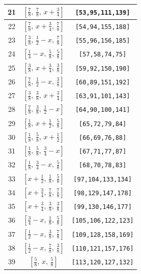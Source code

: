 \documentclass[fleqn,8pt]{jsarticle}
\begin{document}
\begin{longtable}{ccc}
21 & $\left[ \frac{7}{8},\, \frac{7}{8},\, x + \frac{3}{4} \right]$ & {\tt [53,95,111,139]} \\ \hline
22 & $\left[ \frac{7}{8},\, x + \frac{3}{4},\, \frac{7}{8} \right]$ & {\tt [54,94,155,188]} \\ \hline
23 & $\left[ \frac{3}{8},\, \frac{1}{2} - x,\, \frac{7}{8} \right]$ & {\tt [55,96,156,185]} \\ \hline
24 & $\left[ \frac{1}{4} - x,\, \frac{5}{8},\, \frac{5}{8} \right]$ & {\tt [57,58,74,75]} \\ \hline
25 & $\left[ \frac{3}{8},\, x + \frac{3}{4},\, \frac{3}{8} \right]$ & {\tt [59,92,150,190]} \\ \hline
26 & $\left[ \frac{7}{8},\, \frac{1}{2} - x,\, \frac{3}{8} \right]$ & {\tt [60,89,151,192]} \\ \hline
27 & $\left[ \frac{3}{8},\, \frac{3}{8},\, x + \frac{3}{4} \right]$ & {\tt [63,91,101,143]} \\ \hline
28 & $\left[ \frac{7}{8},\, \frac{3}{8},\, \frac{1}{2} - x \right]$ & {\tt [64,90,100,141]} \\ \hline
29 & $\left[ \frac{1}{8},\, x + \frac{1}{2},\, \frac{5}{8} \right]$ & {\tt [65,72,79,84]} \\ \hline
30 & $\left[ \frac{1}{8},\, \frac{5}{8},\, x + \frac{1}{2} \right]$ & {\tt [66,69,76,88]} \\ \hline
31 & $\left[ \frac{1}{8},\, \frac{5}{8},\, \frac{3}{4} - x \right]$ & {\tt [67,71,77,87]} \\ \hline
32 & $\left[ \frac{1}{8},\, \frac{3}{4} - x,\, \frac{5}{8} \right]$ & {\tt [68,70,78,83]} \\ \hline
33 & $\left[ x + \frac{1}{2},\, \frac{1}{8},\, \frac{5}{8} \right]$ & {\tt [97,104,133,134]} \\ \hline
34 & $\left[ x + \frac{3}{4},\, \frac{7}{8},\, \frac{7}{8} \right]$ & {\tt [98,129,147,178]} \\ \hline
35 & $\left[ x + \frac{3}{4},\, \frac{3}{8},\, \frac{3}{8} \right]$ & {\tt [99,130,146,177]} \\ \hline
36 & $\left[ \frac{3}{4} - x,\, \frac{1}{8},\, \frac{5}{8} \right]$ & {\tt [105,106,122,123]} \\ \hline
37 & $\left[ \frac{1}{2} - x,\, \frac{3}{8},\, \frac{7}{8} \right]$ & {\tt [109,128,158,169]} \\ \hline
38 & $\left[ \frac{1}{2} - x,\, \frac{7}{8},\, \frac{3}{8} \right]$ & {\tt [110,121,157,176]} \\ \hline
39 & $\left[ \frac{5}{8},\, x,\, \frac{5}{8} \right]$ & {\tt [113,120,127,132]} \\ \hline

\end{longtable}
\end{document}
